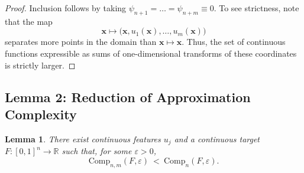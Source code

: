 \documentclass{article}
\newtheorem{lemma}{Lemma}
\begin{document}
\begin{proof}
Inclusion follows by taking 
\(\psi_{n+1}=\dots=\psi_{n+m} \equiv 0\).
To see strictness, note that the map
\[
\mathbf{x} \mapsto \big(\mathbf{x}, u_1(\mathbf{x}),\dots,u_m(\mathbf{x})\big)
\]
separates more points in the domain than 
\(\mathbf{x} \mapsto \mathbf{x}\).
Thus, the set of continuous functions expressible as sums of one-dimensional transforms
of these coordinates is strictly larger.
\end{proof}

\subsection{Lemma 2: Reduction of Approximation Complexity}

\begin{lemma}
\label{lem:complexity-reduction}
There exist continuous features \(u_j\) and a continuous target 
\(F:[0,1]^n \to \mathbb{R}\) such that, for some \(\varepsilon>0\),
\[
\mathrm{Comp}_{n,m}(F,\varepsilon)
\ <\
\mathrm{Comp}_{n}(F,\varepsilon).
\]
\end{lemma}
\end{document}
